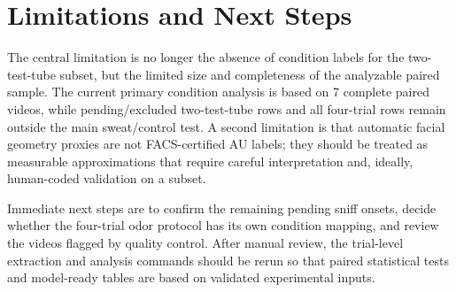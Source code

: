 \documentclass[11pt]{article}
\begin{document}
\section{Limitations and Next Steps}
The central limitation is no longer the absence of condition labels for the two-test-tube subset, but the limited size and completeness of the analyzable paired sample. The current primary condition analysis is based on 7 complete paired videos, while pending/excluded two-test-tube rows and all four-trial rows remain outside the main sweat/control test. A second limitation is that automatic facial geometry proxies are not FACS-certified AU labels; they should be treated as measurable approximations that require careful interpretation and, ideally, human-coded validation on a subset.

Immediate next steps are to confirm the remaining pending sniff onsets, decide whether the four-trial odor protocol has its own condition mapping, and review the videos flagged by quality control. After manual review, the trial-level extraction and analysis commands should be rerun so that paired statistical tests and model-ready tables are based on validated experimental inputs.

\nocite{*}


\end{document}
